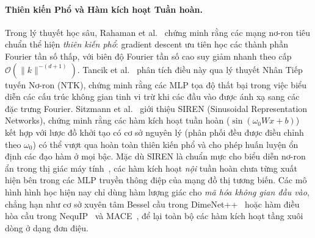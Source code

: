 \documentclass[10pt,twocolumn,letterpaper]{article}
\begin{document}
\paragraph{Thiên kiến Phổ và Hàm kích hoạt Tuần hoàn.}
Trong lý thuyết học sâu, Rahaman et al.~\cite{rahaman2019spectral} chứng minh rằng các mạng nơ-ron tiêu chuẩn thể hiện \textit{thiên kiến phổ}: gradient descent ưu tiên học các thành phần Fourier tần số thấp, với biên độ Fourier tần số cao suy giảm nhanh theo cấp $\mathcal{O}(\|k\|^{-(d+1)})$.
Tancik et al.~\cite{tancik2020fourier} phân tích điều này qua lý thuyết Nhân Tiếp tuyến Nơ-ron (NTK), chứng minh rằng các MLP tọa độ thất bại trong việc biểu diễn các cấu trúc không gian tinh vi trừ khi các đầu vào được ánh xạ sang các đặc trưng Fourier.
Sitzmann et al.~\cite{sitzmann2020siren} giới thiệu SIREN (Sinusoidal Representation Networks), chứng minh rằng các hàm kích hoạt tuần hoàn ($\sin(\omega_0 W x + b)$) kết hợp với lược đồ khởi tạo có cơ sở nguyên lý (phân phối đều được điều chỉnh theo $\omega_0$) có thể vượt qua hoàn toàn thiên kiến phổ và cho phép huấn luyện ổn định các đạo hàm ở mọi bậc.
Mặc dù SIREN là chuẩn mực cho biểu diễn nơ-ron ẩn trong thị giác máy tính~\cite{sitzmann2020siren}, các hàm kích hoạt \textit{nội} tuần hoàn chưa từng xuất hiện bên trong các MLP truyền thông điệp của mạng đồ thị tương biến. Các mô hình hình học hiện nay chỉ dùng hàm lượng giác cho \textit{mã hóa không gian đầu vào}, chẳng hạn như cơ sở xuyên tâm Bessel cầu trong DimeNet++~\cite{klicperaFastUncertaintyAwareDirectional2020} hoặc hàm điều hòa cầu trong NequIP~\cite{batznerE3equivariantGraphNeural2021} và MACE~\cite{batatiaMACEHigherOrder2022}, để lại toàn bộ các hàm kích hoạt tầng xuôi dòng ở dạng đơn điệu.
\end{document}
